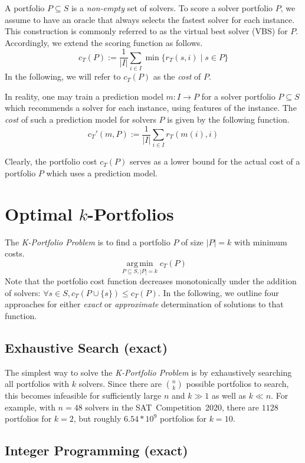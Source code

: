 \documentclass[conference]{IEEEtran}
\DeclareMathOperator*{\argmin}{arg\,min}
\begin{document}
A portfolio $P \subseteq S$ is a \emph{non-empty} set of solvers.
To score a solver portfolio $P$, we assume to have an oracle that always selects the fastest solver for each instance. 
This construction is commonly referred to as the virtual best solver (VBS) for $P$. 
Accordingly, we extend the scoring function as follows.%
$$
	c_{T}(P) := \frac{1}{|I|} \sum\limits_{i \in I}{\min\{r_T(s,i) \mid s \in P\}}
$$
In the following, we will refer to $c_{T}(P)$ as the \emph{cost} of $P$. 

In reality, one may train a prediction model $m : I \rightarrow P$ for a solver portfolio $P \subseteq S$ which recommends a solver for each instance, using features of the instance. 
The \emph{cost} of such a prediction model for solvers $P$ is given by the following function.%
$$
	c_{T}'(m,P) := \frac{1}{|I|} \sum\limits_{i \in I}{r_T(m(i),i)}
$$

Clearly, the portfolio cost $c_{T}(P)$ serves as a lower bound for the actual cost of a portfolio $P$ which uses a prediction model.

\section{Optimal \texorpdfstring{$k$}{k}-Portfolios} %
\label{sec:approach}

The \emph{K-Portfolio Problem} is to find a portfolio $P$ of size $|P| = k$ with minimum costs.%
$$
\argmin\limits_{P \subseteq S, |P| = k} c_{T}(P)
$$
Note that the portfolio cost function decreases monotonically under the addition of solvers: $\forall s \in S, c_{T}(P \cup \{s\}) \leq c_{T}(P)$. 
In the following, we outline four approaches for either \emph{exact} or \emph{approximate} determination of solutions to that function. 

\subsection{Exhaustive Search (exact)}

The simplest way to solve the \emph{K-Portfolio Problem} is by exhaustively searching all portfolios with $k$ solvers. 
Since there are $\binom{n}{k}$ possible portfolios to search, this becomes infeasible for sufficiently large $n$ and $k \gg 1$ as well as $k \ll n$.
For example, with $n=48$ solvers in the SAT~Competition~2020, there are $1128$ portfolios for $k=2$, but roughly $6.54 * 10^9$ portfolios for $k=10$.

\subsection{Integer Programming (exact)}
\end{document}

